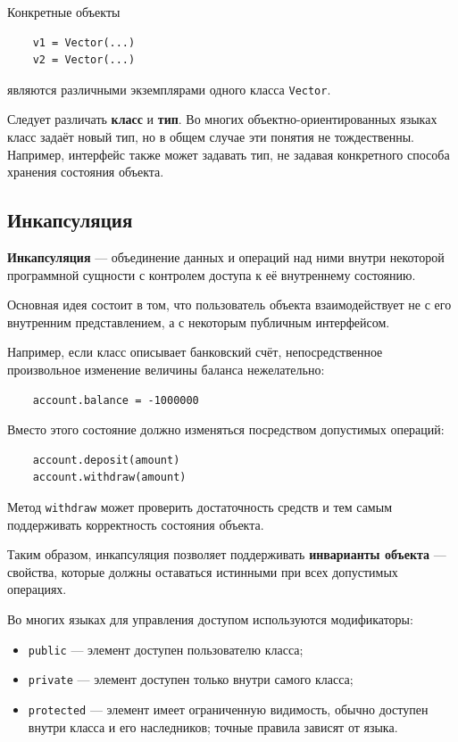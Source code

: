 Конкретные объекты
\begin{verbatim}
	v1 = Vector(...)
	v2 = Vector(...)
\end{verbatim}

являются различными экземплярами одного класса \texttt{Vector}.

Следует различать \textbf{класс} и \textbf{тип}. Во многих объектно-ориентированных языках класс задаёт новый тип, но в общем случае эти понятия не тождественны. Например, интерфейс также может задавать тип, не задавая конкретного способа хранения состояния объекта.

\subsection{Инкапсуляция}

\textbf{Инкапсуляция} --- объединение данных и операций над ними внутри некоторой программной сущности с контролем доступа к её внутреннему состоянию.

Основная идея состоит в том, что пользователь объекта взаимодействует не с его внутренним представлением, а с некоторым публичным интерфейсом.

Например, если класс описывает банковский счёт, непосредственное произвольное изменение величины баланса нежелательно:
\begin{verbatim}
	account.balance = -1000000
\end{verbatim}

Вместо этого состояние должно изменяться посредством допустимых операций:
\begin{verbatim}
	account.deposit(amount)
	account.withdraw(amount)
\end{verbatim}

Метод \texttt{withdraw} может проверить достаточность средств и тем самым поддерживать корректность состояния объекта.

Таким образом, инкапсуляция позволяет поддерживать \textbf{инварианты объекта} --- свойства, которые должны оставаться истинными при всех допустимых операциях.

Во многих языках для управления доступом используются модификаторы:
\begin{itemize}
	\item \texttt{public} --- элемент доступен пользователю класса;
	\item \texttt{private} --- элемент доступен только внутри самого класса;
	\item \texttt{protected} --- элемент имеет ограниченную видимость, обычно доступен внутри класса и его наследников; точные правила зависят от языка.
\end{itemize}

